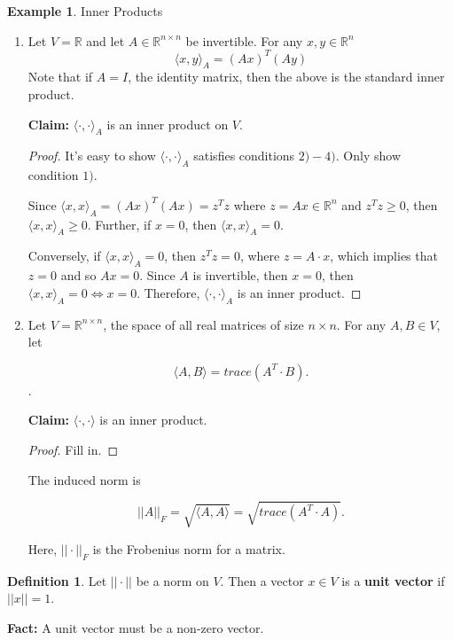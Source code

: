\documentclass[12pt]{article}
\theoremstyle{definition}
\newtheorem*{definition}{Definition}
\newtheorem*{example}{Example}
\begin{document}
\begin{example} Inner Products
\begin{enumerate}[label = (\arabic*)]
\item Let $V = \mathbb{R}$ and let $A \in \mathbb{R}^{n \times n}$ be invertible.
For any $x, y \in \mathbb{R}^n$
\[ \langle x, y \rangle_{A} = (Ax)^T(Ay) \]
Note that if $A = I$, the identity matrix, then the above is the standard inner product.

\textbf{Claim:} $\langle \cdot, \cdot \rangle_{A}$ is an inner product on $V$.
\begin{proof}
It's easy to show $\langle \cdot, \cdot \rangle_{A}$ satisfies conditions $2) - 4)$. Only show
condition $1)$.

Since $\langle x, x \rangle_A = (Ax)^T (Ax) = z^Tz$ where $z = Ax \in \mathbb{R}^n$ and
$z^Tz \geq 0$, then $\langle x, x \rangle_A \geq 0$. Further, if $x = 0$, then 
$\langle x, x \rangle_A = 0$. 

Conversely, if $\langle x, x \rangle_A = 0$, then $z^Tz = 0$, where $z = A \cdot x$, which
implies that $z = 0$ and so $Ax = 0$. Since $A$ is invertible, then $x = 0$, then
$\langle x, x \rangle_A = 0 \iff x = 0$. Therefore, $\langle \cdot , \cdot \rangle_A$ is
an inner product.
\end{proof}

\item Let $V = \mathbb{R}^{n \times n}$, the space of all real matrices of size $n \times n$.
For any $A, B \in V$, let

\[\langle A, B \rangle = trace(A^T \cdot B). \].

\textbf{Claim:} $\langle \cdot, \cdot \rangle$ is an inner product.
\begin{proof} Fill in.
\end{proof}

The induced norm is

\[ ||A||_F = \sqrt{ \langle A, A \rangle } = \sqrt{ trace(A^T \cdot A) }. \]

Here, $|| \cdot ||_F$ is the Frobenius norm for a matrix.

\end{enumerate}
\end{example}

\begin{definition}
Let $|| \cdot ||$ be a norm on $V$. Then a vector $x \in V$ is a \textbf{unit vector} if $|| x || = 1$.

\textbf{Fact:} A unit vector must be a non-zero vector.
\end{definition}
\end{document}
